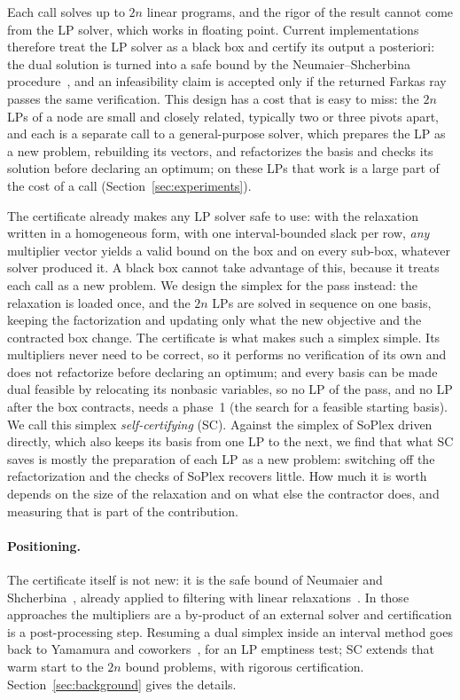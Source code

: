 \documentclass[11pt]{article}
\theoremstyle{definition}
\theoremstyle{remark}
\begin{document}
Each call solves up to $2n$ linear programs, and the rigor of the result cannot
come from the LP solver, which works in floating point. Current implementations
therefore treat the LP solver as a black box and certify its output a
posteriori: the dual solution is turned into a safe bound by the
Neumaier--Shcherbina procedure~\cite{neumaier2004safe}, and an infeasibility
claim is accepted only if the returned Farkas ray passes the same verification.
This design has a cost that is easy to miss: the $2n$ LPs of a node are small
and closely related, typically two or three pivots apart, and each is a
separate call to a general-purpose solver, which prepares the LP as a new
problem, rebuilding its vectors, and refactorizes the basis and checks its
solution before declaring an optimum; on these LPs that work is a large part
of the cost of a call
(Section~\ref{sec:experiments}).

The certificate already makes any LP solver safe to use: with the relaxation
written in a homogeneous form, with one interval-bounded slack per row,
\emph{any} multiplier vector yields a valid bound on the box and on every
sub-box, whatever solver produced it. A black box cannot take advantage of
this, because it treats each call as a new problem. We design the simplex for
the pass instead: the relaxation is loaded once, and the $2n$ LPs are solved
in sequence on one basis, keeping the factorization and updating only what
the new objective and the contracted box change. The certificate is what
makes such a simplex simple. Its multipliers never need to be correct, so it
performs no verification of its own and does not refactorize before
declaring an optimum; and every basis can be made dual feasible by relocating
its nonbasic variables, so no LP of the pass, and no LP after the box
contracts, needs a phase~1 (the search for a feasible starting basis). We call
this simplex \emph{self-certifying} (SC). Against the simplex of SoPlex driven
directly, which also keeps its basis from one LP to the next, we find that
what SC saves is mostly the preparation of each LP as a new problem: switching
off the refactorization and the checks of SoPlex recovers little. How much it
is worth depends on the size of the relaxation and on what else the
contractor does, and measuring that is part of the contribution.

\paragraph{Positioning.} The certificate itself is not new: it is the safe
bound of Neumaier and Shcherbina~\cite{neumaier2004safe}, already applied to
filtering with linear
relaxations~\cite{domes2012rigorous,reyes2023preconditioning}. In those
approaches the multipliers are a by-product of an external solver and
certification is a post-processing step. Resuming a dual simplex inside an
interval method goes back to Yamamura and
coworkers~\cite{yamamura2001dual,yamamura2006dual}, for an LP emptiness test;
SC extends that warm start to the $2n$ bound problems, with rigorous
certification. Section~\ref{sec:background} gives the details.
\end{document}
